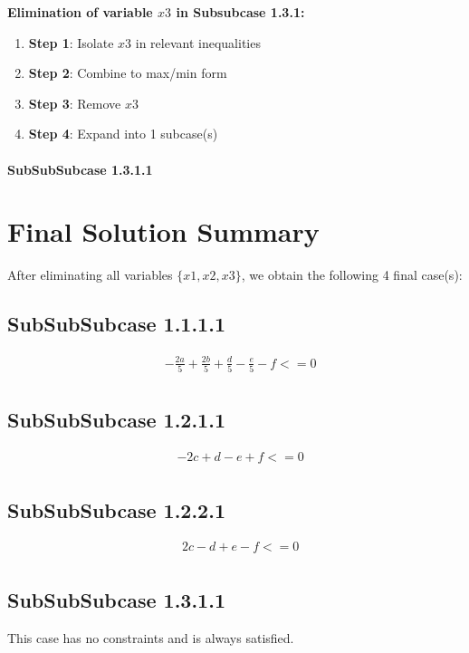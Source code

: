 \documentclass{article}
\begin{document}
\textbf{Elimination of variable $x3$ in Subsubcase 1.3.1:}

\begin{enumerate}
\item \textbf{Step 1}: Isolate $x3$ in relevant inequalities
\item \textbf{Step 2}: Combine to max/min form
\item \textbf{Step 3}: Remove $x3$
\item \textbf{Step 4}: Expand into 1 subcase(s)
\end{enumerate}

\paragraph{SubSubSubcase 1.3.1.1}

\section{Final Solution Summary}

After eliminating all variables $\{x1, x2, x3\}$, we obtain
the following 4 final case(s):

\subsection{SubSubSubcase 1.1.1.1}

\begin{align}
& - \frac{2 a}{5} + \frac{2 b}{5} + \frac{d}{5} - \frac{e}{5} - f <= 0 \\
\end{align}

\subsection{SubSubSubcase 1.2.1.1}

\begin{align}
& - 2 c + d - e + f <= 0 \\
\end{align}

\subsection{SubSubSubcase 1.2.2.1}

\begin{align}
& 2 c - d + e - f <= 0 \\
\end{align}

\subsection{SubSubSubcase 1.3.1.1}

This case has no constraints and is always satisfied.
\end{document}
